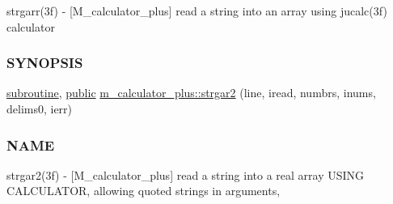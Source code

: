 \begin{DoxyCompactItemize}
\begin{DoxyCompactList}
strgarr(3f) -\/ \mbox{[}M\+\_\+calculator\+\_\+plus\mbox{]} read a string into an array using jucalc(3f) calculator \subsubsection*{S\+Y\+N\+O\+P\+S\+IS}\end{DoxyCompactList}\item 
\hyperlink{M__stopwatch_83_8txt_acfbcff50169d691ff02d4a123ed70482}{subroutine}, \hyperlink{M__stopwatch_83_8txt_a2f74811300c361e53b430611a7d1769f}{public} \hyperlink{namespacem__calculator__plus_a59710eb6babeed1f4b8d439f97d5d90a}{m\+\_\+calculator\+\_\+plus\+::strgar2} (line, iread, numbrs, inums, delims0, ierr)
\begin{DoxyCompactList}\small\item\em \subsubsection*{N\+A\+ME}

strgar2(3f) -\/ \mbox{[}M\+\_\+calculator\+\_\+plus\mbox{]} read a string into a real array U\+S\+I\+NG C\+A\+L\+C\+U\+L\+A\+T\+OR, allowing quoted strings in arguments, \end{DoxyCompactList}\end{DoxyCompactItemize}
